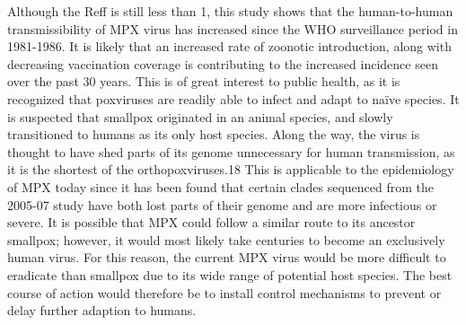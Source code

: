 Although the Reff is still less than 1, this study shows that the human-to-human transmissibility of MPX virus has increased since the WHO surveillance period in 1981-1986. It is likely that an increased rate of zoonotic introduction, along with decreasing vaccination coverage is contributing to the increased incidence seen over the past 30 years. This is of great interest to public health, as it is recognized that poxviruses are readily able to infect and adapt to naïve species. It is suspected that smallpox originated in an animal species, and slowly transitioned to humans as its only host species. Along the way, the virus is thought to have shed parts of its genome unnecessary for human transmission, as it is the shortest of the orthopoxviruses.18 This is applicable to the epidemiology of MPX today since it has been found that certain clades sequenced from the 2005-07 study have both lost parts of their genome and are more infectious or severe. It is possible that MPX could follow a similar route to its ancestor smallpox; however, it would most likely take centuries to become an exclusively human virus. For this reason, the current MPX virus would be more difficult to eradicate than smallpox due to its wide range of potential host species. The best course of action would therefore be to install control mechanisms to prevent or delay further adaption to humans.

